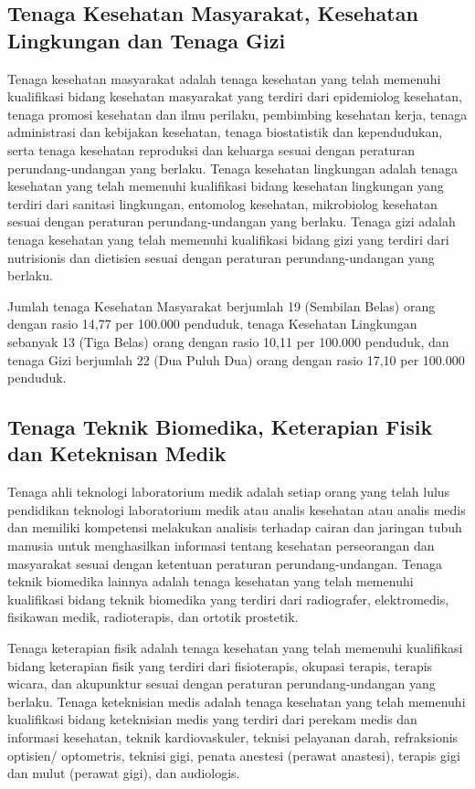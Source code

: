 \subsection{Tenaga Kesehatan Masyarakat, Kesehatan Lingkungan dan Tenaga Gizi}
Tenaga kesehatan masyarakat adalah tenaga kesehatan yang telah memenuhi kualifikasi bidang kesehatan masyarakat
yang terdiri dari epidemiolog kesehatan, tenaga promosi kesehatan dan ilmu perilaku, pembimbing kesehatan kerja,
tenaga administrasi dan kebijakan kesehatan, tenaga biostatistik dan kependudukan, serta tenaga kesehatan reproduksi
dan keluarga sesuai dengan peraturan perundang-undangan yang berlaku.
Tenaga kesehatan lingkungan adalah tenaga kesehatan yang telah memenuhi kualifikasi bidang kesehatan lingkungan yang terdiri dari sanitasi lingkungan,
entomolog kesehatan, mikrobiolog kesehatan sesuai dengan peraturan perundang-undangan yang berlaku.
Tenaga gizi adalah tenaga kesehatan yang telah memenuhi kualifikasi bidang gizi yang terdiri dari nutrisionis dan dietisien
sesuai dengan peraturan perundang-undangan yang berlaku.

Jumlah tenaga Kesehatan Masyarakat berjumlah 19 (Sembilan Belas) orang dengan rasio 14,77 per 100.000 penduduk, tenaga Kesehatan Lingkungan sebanyak 13 (Tiga Belas) orang dengan rasio 10,11 per 100.000 penduduk, dan tenaga Gizi berjumlah 22 (Dua Puluh Dua) orang dengan rasio 17,10 per 100.000 penduduk.

\subsection{Tenaga Teknik Biomedika, Keterapian Fisik dan Keteknisan Medik}
Tenaga ahli teknologi laboratorium medik adalah setiap orang yang telah lulus pendidikan teknologi laboratorium medik atau analis
kesehatan atau analis medis dan memiliki kompetensi melakukan analisis terhadap cairan dan jaringan tubuh manusia untuk
menghasilkan informasi tentang kesehatan perseorangan dan masyarakat sesuai dengan ketentuan peraturan perundang-undangan.
Tenaga teknik biomedika lainnya adalah tenaga kesehatan yang telah memenuhi kualifikasi bidang teknik biomedika yang terdiri dari radiografer, elektromedis, fisikawan medik, radioterapis, dan ortotik prostetik.

Tenaga keterapian fisik adalah tenaga kesehatan yang telah memenuhi kualifikasi bidang keterapian fisik yang terdiri
dari fisioterapis, okupasi terapis, terapis wicara, dan akupunktur sesuai dengan peraturan perundang-undangan yang
berlaku.
Tenaga keteknisian medis adalah tenaga kesehatan yang telah memenuhi kualifikasi bidang keteknisian medis yang
terdiri dari perekam medis dan informasi kesehatan, teknik kardiovaskuler, teknisi pelayanan darah, refraksionis
optisien/ optometris, teknisi gigi, penata anestesi (perawat anastesi), terapis gigi dan mulut (perawat gigi), dan audiologis.

